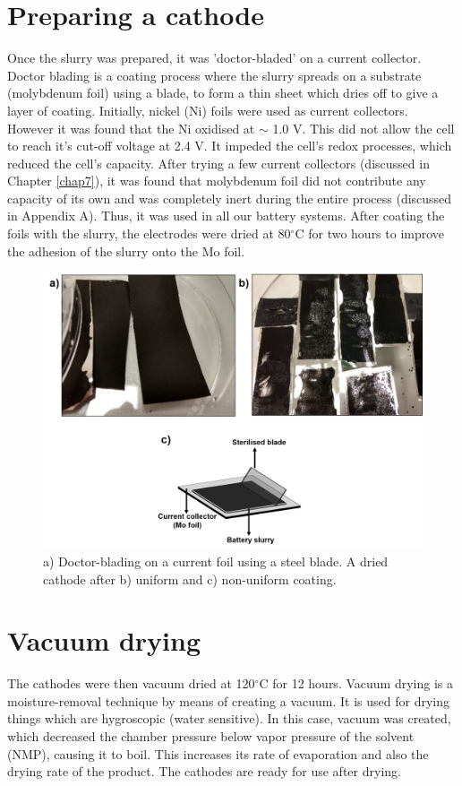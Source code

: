 \section{Preparing a cathode}
Once the slurry was prepared, it was 'doctor-bladed' on a current collector. Doctor blading is a coating process where the slurry spreads on a substrate (molybdenum foil)  using a blade, to form a thin sheet which dries off to give a layer of coating.  Initially, nickel (Ni) foils were used as current collectors. However it was found that the Ni oxidised at $\sim$ 1.0 V. This did not allow the cell to reach it's cut-off voltage at 2.4 V. It impeded the cell's redox processes, which reduced the cell's capacity. After trying a few current collectors (discussed in Chapter \ref{chap7}), it was found that molybdenum foil did not contribute any capacity of its own and was completely inert during the entire process (discussed in Appendix A). Thus, it was used in all our battery systems. After coating the foils with the slurry, the electrodes were dried at 80$^{\circ}$C for two hours to improve the adhesion of the slurry onto the Mo foil. 

\begin{figure}[tbh!]
\centering
\includegraphics[width=\textwidth]{Figures/chap3fig/coating}
\caption{a) Doctor-blading on a current foil using a steel blade. A dried cathode after b) uniform and c) non-uniform coating.}
\label{Figures/chap3fig:coating}
\end{figure}

\section{Vacuum drying}
The cathodes were then vacuum dried at 120$^{\circ}$C for 12 hours. Vacuum drying is a moisture-removal technique by means of creating a vacuum. It is used for drying things which are hygroscopic (water sensitive). In this case, vacuum was created, which decreased the chamber pressure below vapor pressure of the solvent (NMP), causing it to boil. This increases its rate of evaporation and also the drying rate of the product. The cathodes are ready for use after drying. 

